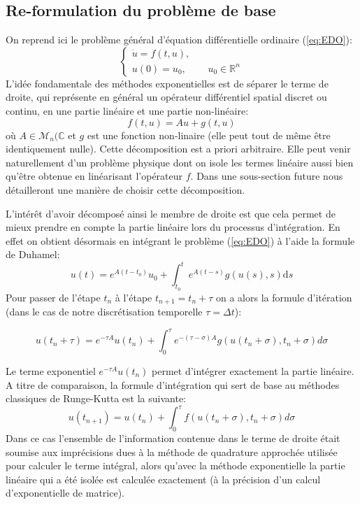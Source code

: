 \subsection{Re-formulation du problème de base}
On reprend ici le problème général d'équation différentielle ordinaire (\ref{eq:EDO}):
$$
\left\{
    \begin{aligned}
        \dot{u} = f(t,u),&\\
        u(0) = u_0,& \quad u_0 \in \mathbb{R}^n
    \end{aligned}
\right.
$$
L'idée fondamentale des méthodes exponentielles est de séparer le terme de droite, qui représente en général un opérateur différentiel spatial discret ou continu, en une partie linéaire et une partie non-linéaire:
\begin{equation}
    f(t,u) = Au + g(t,u)
\end{equation}
où $A\in \mathcal{M}_n(\mathbb{C}$ et $g$ est une fonction non-linaire (elle peut tout de même être identiquement nulle). Cette décomposition est a priori arbitraire. Elle peut venir naturellement d'un problème physique dont on isole les termes linéaire aussi bien qu'être obtenue en linéarisant l'opérateur $f$. Dans une sous-section future nous détailleront une manière de choisir cette décomposition.

L'intérêt d'avoir décomposé ainsi le membre de droite est que cela permet de mieux prendre en compte la partie linéaire lors du processus d'intégration. En effet on obtient désormais en intégrant le problème (\ref{eq:EDO}) à l'aide la formule de Duhamel:
\begin{equation} 
    u(t)=e^{A(t-t_{0})} u_{0}+\int_{t_{0}}^{t} e^{A(t-s)} g(u(s), s) \text{d} s
\end{equation}
Pour passer de l'étape $t_n$ à l'étape $t_{n+1} = t_n +\tau$ on a alors la formule d'itération (dans le cas de notre discrétisation temporelle $\tau = \Delta t$):

\begin{equation} 
    u\left(t_{n}+\tau \right)=e^{-\tau A} u\left(t_{n}\right)+\int_{0}^{\tau} e^{-(\tau-\sigma) A} g\left(u\left(t_{n}+\sigma\right),t_n+\sigma\right) d \sigma
    \label{eq:itExp}
\end{equation}

Le terme exponentiel $e^{-\tau A} u\left(t_{n}\right)$ permet d'intégrer exactement la partie linéaire. A titre de comparaison, la formule d'intégration qui sert de base au méthodes classiques de Runge-Kutta est la suivante:
$$
u(t_{n+1}) = u(t_n) + \int_{0}^{\tau} f\left(u\left(t_{n}+\sigma\right),t_n+\sigma\right) d \sigma
$$
Dans ce cas l'ensemble de l'information contenue dans le terme de droite était soumise aux imprécisions dues à la méthode de quadrature approchée utilisée pour calculer le terme intégral, alors qu'avec la méthode exponentielle la partie linéaire qui a été isolée est calculée exactement (à la précision d'un calcul d'exponentielle de matrice).

